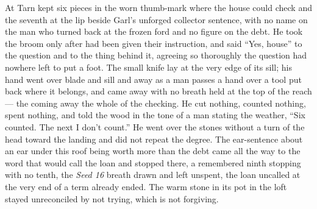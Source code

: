 At  Tarn kept six pieces in the worn thumb-mark where the house could check and the seventh at the lip beside Garl's unforged collector sentence, with no name on the man who turned back at the frozen ford and no figure on the debt. He took the broom only after  had been given their instruction, and said “Yes, house” to the question and to the thing behind it, agreeing so thoroughly the question had nowhere left to put a foot. The small knife lay at the very edge of its sill; his hand went over blade and sill and away as a man passes a hand over a tool put back where it belongs, and came away with no breath held at the top of the reach --- the coming away the whole of the checking. He cut nothing, counted nothing, spent nothing, and told the wood in the tone of a man stating the weather, “Six counted. The next I don't count.” He went over the stones without a turn of the head toward the landing and did not repeat the degree. The ear-sentence about an ear under this roof being worth more than the debt came all the way to the word that would call the loan and stopped there, a remembered ninth stopping with no tenth, the \emph{Seed 16} breath drawn and left unspent, the loan uncalled at the very end of a term already ended. The warm stone in its pot in the loft stayed unreconciled by not trying, which is not forgiving.

